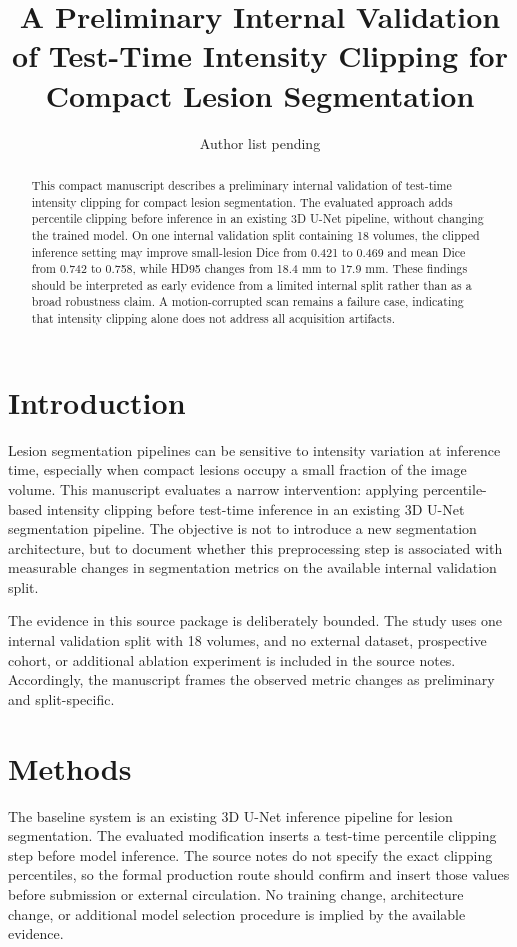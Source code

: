 \documentclass[11pt]{article}
\title{A Preliminary Internal Validation of Test-Time Intensity Clipping for Compact Lesion Segmentation}
\author{Author list pending}
\date{}
\begin{document}
\maketitle

\begin{abstract}
This compact manuscript describes a preliminary internal validation of test-time intensity clipping for compact lesion segmentation. The evaluated approach adds percentile clipping before inference in an existing 3D U-Net pipeline, without changing the trained model. On one internal validation split containing 18 volumes, the clipped inference setting may improve small-lesion Dice from 0.421 to 0.469 and mean Dice from 0.742 to 0.758, while HD95 changes from 18.4 mm to 17.9 mm. These findings should be interpreted as early evidence from a limited internal split rather than as a broad robustness claim. A motion-corrupted scan remains a failure case, indicating that intensity clipping alone does not address all acquisition artifacts.
\end{abstract}

\section{Introduction}

Lesion segmentation pipelines can be sensitive to intensity variation at inference time, especially when compact lesions occupy a small fraction of the image volume. This manuscript evaluates a narrow intervention: applying percentile-based intensity clipping before test-time inference in an existing 3D U-Net segmentation pipeline. The objective is not to introduce a new segmentation architecture, but to document whether this preprocessing step is associated with measurable changes in segmentation metrics on the available internal validation split.

The evidence in this source package is deliberately bounded. The study uses one internal validation split with 18 volumes, and no external dataset, prospective cohort, or additional ablation experiment is included in the source notes. Accordingly, the manuscript frames the observed metric changes as preliminary and split-specific.

\section{Methods}

The baseline system is an existing 3D U-Net inference pipeline for lesion segmentation. The evaluated modification inserts a test-time percentile clipping step before model inference. The source notes do not specify the exact clipping percentiles, so the formal production route should confirm and insert those values before submission or external circulation. No training change, architecture change, or additional model selection procedure is implied by the available evidence.
\end{document}
